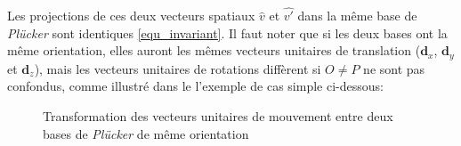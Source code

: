 \documentclass{report}
\begin{document}
Les projections de ces deux vecteurs spatiaux $\widehat{v}$ et $\widehat{v'}$ dans la même base de \emph{Plücker} sont identiques \eqref{equ_invariant}. Il faut noter que si les deux bases ont la même orientation, elles auront les mêmes vecteurs unitaires de translation ($\textbf{d}_{x}$, $\textbf{d}_{y}$ et $\textbf{d}_{z}$), mais les vecteurs unitaires de rotations diffèrent si $O \neq P$ ne sont pas confondus, comme illustré dans le l'exemple de cas simple ci-dessous:

\begin{figure}[H]
\begin{center}
  \hspace{1cm}
  \hspace{1cm}
   \hfill
  \caption{Transformation des vecteurs unitaires de mouvement entre deux bases de \emph{Plücker} de même orientation}  %
  \label{fig_transPlucker}    %
\end{center}
\end{figure}
\end{document}
